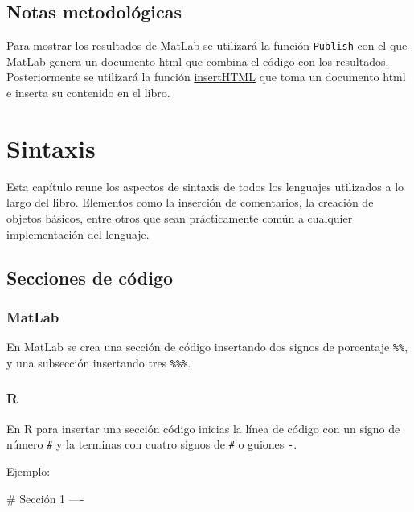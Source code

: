 \documentclass[
]{book}
\begin{document}
\hypertarget{notas-metodoluxf3gicas}{%
\section*{Notas metodológicas}\label{notas-metodoluxf3gicas}}

Para mostrar los resultados de MatLab se utilizará la función \texttt{Publish} con el que MatLab genera un documento html que combina el código con los resultados. Posteriormente se utilizará la función \href{https://drdsdaniel.github.io/Dmisc/reference/insertHTML.html}{insertHTML} que toma un documento html e inserta su contenido en el libro.

\hypertarget{sintaxis}{%
\chapter{Sintaxis}\label{sintaxis}}

Esta capítulo reune los aspectos de sintaxis de todos los lenguajes utilizados a lo largo del libro. Elementos como la inserción de comentarios, la creación de objetos básicos, entre otros que sean prácticamente común a cualquier implementación del lenguaje.

\hypertarget{secciones-de-cuxf3digo}{%
\section{Secciones de código}\label{secciones-de-cuxf3digo}}

\hypertarget{matlab}{%
\subsection{MatLab}\label{matlab}}

En MatLab se crea una sección de código insertando dos signos de porcentaje \texttt{\%\%}, y una subsección insertando tres \texttt{\%\%\%}.

\hypertarget{r}{%
\subsection{R}\label{r}}

En R para insertar una sección código inicias la línea de código con un signo de número \texttt{\#} y la terminas con cuatro signos de \texttt{\#} o guiones \texttt{-}.

Ejemplo:

\# Sección 1 ----
\end{document}
